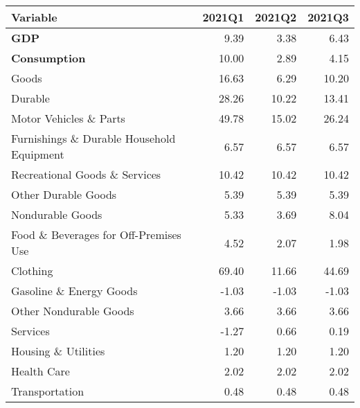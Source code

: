 \documentclass[11pt, letterpaper]{article}\usepackage[]{graphicx}\usepackage[]{color}
\begin{document}
\begin{table}[H]
\centering
\begingroup\fontsize{10pt}{12pt}\selectfont
\begin{tabular}{lrrr}
  \hline
Variable & 2021Q1 & 2021Q2 & 2021Q3 \\ 
  \hline
\hspace{0mm} \textbf{GDP} & 9.39 & 3.38 & 6.43 \\ 
  \hspace{0mm} \textbf{Consumption} & 10.00 & 2.89 & 4.15 \\ 
  \hspace{8mm}  Goods & 16.63 & 6.29 & 10.20 \\ 
  \hspace{16mm}  Durable & 28.26 & 10.22 & 13.41 \\ 
  \hspace{24mm}  Motor Vehicles \& Parts & 49.78 & 15.02 & 26.24 \\ 
  \hspace{24mm}  Furnishings \& Durable Household Equipment & 6.57 & 6.57 & 6.57 \\ 
  \hspace{24mm}  Recreational Goods \& Services & 10.42 & 10.42 & 10.42 \\ 
  \hspace{24mm}  Other Durable Goods & 5.39 & 5.39 & 5.39 \\ 
  \hspace{16mm}  Nondurable Goods & 5.33 & 3.69 & 8.04 \\ 
  \hspace{24mm}  Food \& Beverages for Off-Premises Use & 4.52 & 2.07 & 1.98 \\ 
  \hspace{24mm}  Clothing & 69.40 & 11.66 & 44.69 \\ 
  \hspace{24mm}  Gasoline \& Energy Goods & -1.03 & -1.03 & -1.03 \\ 
  \hspace{24mm}  Other Nondurable Goods & 3.66 & 3.66 & 3.66 \\ 
  \hspace{8mm}  Services & -1.27 & 0.66 & 0.19 \\ 
  \hspace{16mm}  Housing \& Utilities & 1.20 & 1.20 & 1.20 \\ 
  \hspace{16mm}  Health Care & 2.02 & 2.02 & 2.02 \\ 
  \hspace{16mm}  Transportation & 0.48 & 0.48 & 0.48 \\ 

\end{tabular}
\end{table}
\end{document}
